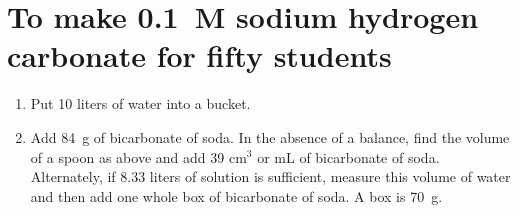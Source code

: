 \section{To make 0.1~M sodium hydrogen carbonate for fifty students} 
\begin{enumerate}
\item{Put 10 liters of water into a bucket.}
\item{Add 84~g of bicarbonate of soda. In the absence of a balance, find the volume of a spoon as above and add 39 $\mathrm{cm}^3$ or $\mathrm{mL}$ of bicarbonate of soda. Alternately, if 8.33 liters of solution is sufficient, measure this volume of water and then add one whole box of bicarbonate of soda. A box is 70~g.}
\end{enumerate}